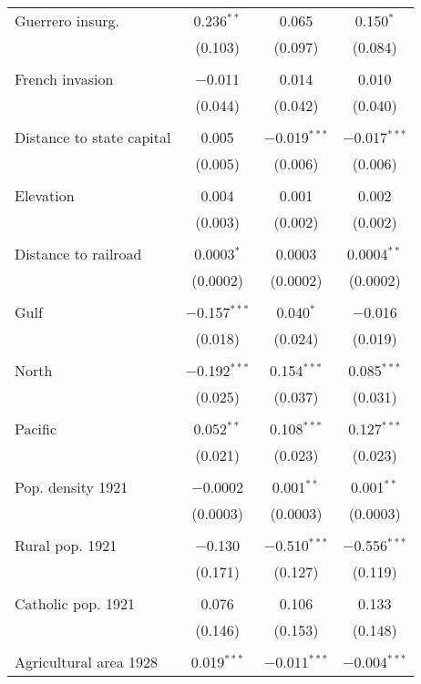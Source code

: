 \begin{table}[!htbp]
\begin{tabular}{@{\extracolsep{5pt}}lccc}
 Guerrero insurg. & 0.236$^{**}$ & 0.065 & 0.150$^{*}$ \\ 
  & (0.103) & (0.097) & (0.084) \\ 
  & & & \\ 
 French invasion & $-$0.011 & 0.014 & 0.010 \\ 
  & (0.044) & (0.042) & (0.040) \\ 
  & & & \\ 
 Distance to state capital & 0.005 & $-$0.019$^{***}$ & $-$0.017$^{***}$ \\ 
  & (0.005) & (0.006) & (0.006) \\ 
  & & & \\ 
 Elevation & 0.004 & 0.001 & 0.002 \\ 
  & (0.003) & (0.002) & (0.002) \\ 
  & & & \\ 
 Distance to railroad & 0.0003$^{*}$ & 0.0003 & 0.0004$^{**}$ \\ 
  & (0.0002) & (0.0002) & (0.0002) \\ 
  & & & \\ 
 Gulf & $-$0.157$^{***}$ & 0.040$^{*}$ & $-$0.016 \\ 
  & (0.018) & (0.024) & (0.019) \\ 
  & & & \\ 
 North & $-$0.192$^{***}$ & 0.154$^{***}$ & 0.085$^{***}$ \\ 
  & (0.025) & (0.037) & (0.031) \\ 
  & & & \\ 
 Pacific & 0.052$^{**}$ & 0.108$^{***}$ & 0.127$^{***}$ \\ 
  & (0.021) & (0.023) & (0.023) \\ 
  & & & \\ 
 Pop. density 1921 & $-$0.0002 & 0.001$^{**}$ & 0.001$^{**}$ \\ 
  & (0.0003) & (0.0003) & (0.0003) \\ 
  & & & \\ 
 Rural pop. 1921 & $-$0.130 & $-$0.510$^{***}$ & $-$0.556$^{***}$ \\ 
  & (0.171) & (0.127) & (0.119) \\ 
  & & & \\ 
 Catholic pop. 1921 & 0.076 & 0.106 & 0.133 \\ 
  & (0.146) & (0.153) & (0.148) \\ 
  & & & \\ 
 Agricultural area 1928 & 0.019$^{***}$ & $-$0.011$^{***}$ & $-$0.004$^{***}$ \\ 

\end{tabular}
\end{table}
